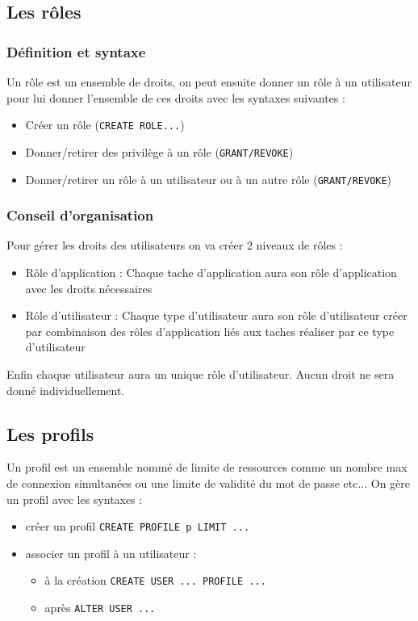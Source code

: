 \documentclass[10pt,a4paper,twoside]{article}
\begin{document}
\subsection{Les rôles}
\subsubsection{Définition et syntaxe}
Un rôle est un ensemble de droits, on peut ensuite donner un rôle à un utilisateur pour lui donner l'ensemble de ces droits avec les syntaxes suivantes :
\begin{itemize}
\item Créer un rôle (\verb=CREATE ROLE...=)
\item Donner/retirer des privilège à un rôle (\verb=GRANT/REVOKE=)
\item Donner/retirer un rôle à un utilisateur ou à un autre rôle (\verb=GRANT/REVOKE=)
\end{itemize}

\subsubsection{Conseil d'organisation}
Pour gérer les droits des utilisateurs on va créer 2 niveaux de rôles :
\begin{itemize}
\item Rôle d'application : Chaque tache d'application aura son rôle d'application avec les droits nécessaires
\item Rôle d'utilisateur : Chaque type d'utilisateur aura son rôle d'utilisateur créer par combinaison des rôles d'application liés aux taches réaliser par ce type d'utilisateur
\end{itemize}
Enfin chaque utilisateur aura un unique rôle d'utilisateur. Aucun droit ne sera donné individuellement.

\subsection{Les profils}
Un profil est un ensemble nommé de limite de ressources comme un nombre max de connexion simultanées ou une limite de validité du mot de passe etc... On gère un profil avec les syntaxes :
\begin{itemize}
\item créer un profil \verb=CREATE PROFILE p LIMIT ...=
\item associer un profil à un utilisateur :
\begin{itemize}
\item à la création \verb=CREATE USER ... PROFILE ...=
\item après \verb=ALTER USER ...=
\end{itemize}
\end{itemize}
\end{document}
